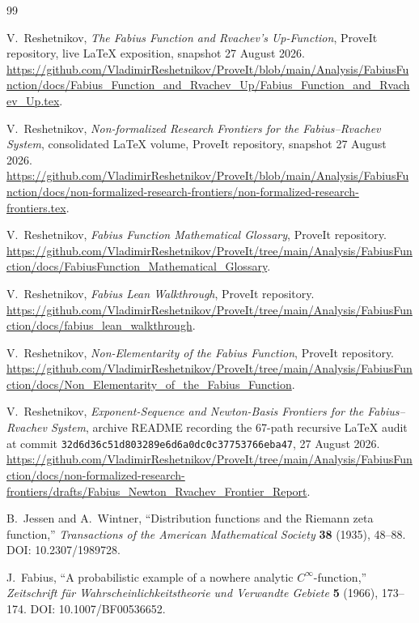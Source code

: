 \documentclass[11pt,oneside]{article}
\theoremstyle{definition}
\theoremstyle{remark}
\newcommand{\1}{\mathbf 1}
\begin{document}
\begin{thebibliography}{99}

V.~Reshetnikov,
\emph{The Fabius Function and Rvachev's Up-Function},
ProveIt repository, live LaTeX exposition, snapshot 27 August 2026.
\url{https://github.com/VladimirReshetnikov/ProveIt/blob/main/Analysis/FabiusFunction/docs/Fabius_Function_and_Rvachev_Up/Fabius_Function_and_Rvachev_Up.tex}.

V.~Reshetnikov,
\emph{Non-formalized Research Frontiers for the Fabius--Rvachev System},
consolidated LaTeX volume, ProveIt repository, snapshot 27 August 2026.
\url{https://github.com/VladimirReshetnikov/ProveIt/blob/main/Analysis/FabiusFunction/docs/non-formalized-research-frontiers/non-formalized-research-frontiers.tex}.

V.~Reshetnikov,
\emph{Fabius Function Mathematical Glossary}, ProveIt repository.
\url{https://github.com/VladimirReshetnikov/ProveIt/tree/main/Analysis/FabiusFunction/docs/FabiusFunction_Mathematical_Glossary}.

V.~Reshetnikov,
\emph{Fabius Lean Walkthrough}, ProveIt repository.
\url{https://github.com/VladimirReshetnikov/ProveIt/tree/main/Analysis/FabiusFunction/docs/fabius_lean_walkthrough}.

V.~Reshetnikov,
\emph{Non-Elementarity of the Fabius Function}, ProveIt repository.
\url{https://github.com/VladimirReshetnikov/ProveIt/tree/main/Analysis/FabiusFunction/docs/Non_Elementarity_of_the_Fabius_Function}.

V.~Reshetnikov,
\emph{Exponent-Sequence and Newton-Basis Frontiers for the Fabius--Rvachev System},
archive README recording the 67-path recursive LaTeX audit at commit
\texttt{32d6d36c51d803289e6d6a0dc0c37753766eba47}, 27 August 2026.
\url{https://github.com/VladimirReshetnikov/ProveIt/tree/main/Analysis/FabiusFunction/docs/non-formalized-research-frontiers/drafts/Fabius_Newton_Rvachev_Frontier_Report}.

B.~Jessen and A.~Wintner,
``Distribution functions and the Riemann zeta function,''
\emph{Transactions of the American Mathematical Society} \textbf{38} (1935),
48--88.  DOI: 10.2307/1989728.

J.~Fabius,
``A probabilistic example of a nowhere analytic \(C^\infty\)-function,''
\emph{Zeitschrift f\"ur Wahrscheinlichkeitstheorie und Verwandte Gebiete}
\textbf{5} (1966), 173--174.  DOI: 10.1007/BF00536652.


\end{thebibliography}
\end{document}
